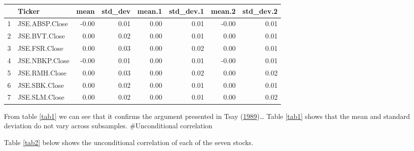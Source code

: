 \documentclass[11pt,preprint, authoryear]{elsarticle}
\let\origtable\table
\let\endorigtable\endtable
\renewenvironment{table}[1][2] {
    \expandafter\origtable\expandafter[H]
} {
    \endorigtable
}
\numberwithin{equation}{section}
\numberwithin{figure}{section}
\numberwithin{table}{section}
\begin{document}
\begin{table}[H]
\centering
\begin{tabular}{rlrrrrrr}
  \hline
 & Ticker & mean & std\_dev & mean.1 & std\_dev.1 & mean.2 & std\_dev.2 \\ 
  \hline
1 & JSE.ABSP.Close & -0.00 & 0.01 & 0.00 & 0.01 & -0.00 & 0.01 \\ 
  2 & JSE.BVT.Close & 0.00 & 0.02 & 0.00 & 0.01 & 0.00 & 0.01 \\ 
  3 & JSE.FSR.Close & 0.00 & 0.03 & 0.00 & 0.02 & 0.00 & 0.01 \\ 
  4 & JSE.NBKP.Close & -0.00 & 0.01 & 0.00 & 0.01 & -0.00 & 0.01 \\ 
  5 & JSE.RMH.Close & 0.00 & 0.03 & 0.00 & 0.02 & 0.00 & 0.02 \\ 
  6 & JSE.SBK.Close & 0.00 & 0.02 & 0.00 & 0.01 & 0.00 & 0.01 \\ 
  7 & JSE.SLM.Close & 0.00 & 0.02 & 0.00 & 0.01 & 0.00 & 0.02 \\ 
   \hline
\end{tabular}
\caption{Short Table Example \label{tab1}} 
\end{table}

From table \ref{tab1} we can see that it confirms the argument presented
in Tsay (\protect\hyperlink{ref-Tsay1989}{1989})\ldots{} Table
\ref{tab1} shows that the mean and standard deviation do not vary across
subsamples. \#Unconditional correlation

Table \ref{tab2} below shows the unconditional correlation of each of
the seven stocks.

\begingroup\fontsize{12pt}{13pt}\selectfont
\end{document}
